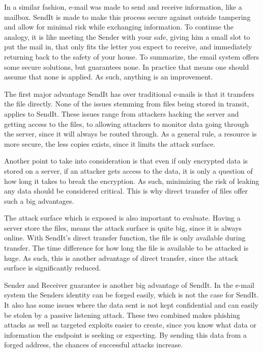 	In a similar fashion, e-mail was made to send and receive information, like a mailbox. SendIt is made to make this process secure against outside tampering and allow for minimal risk while exchanging information. To continue the analogy, it is like meeting the Sender with your safe, giving him a small slot to put the mail in, that only fits the letter you expect to receive, and immediately returning back to the safety of your house. To summarize, the email system offers some secure solutions, but guarantees none. In practice that means one should assume that none is applied. As such, anything is an improvement.

	The first major advantage SendIt has over traditional e-mails is that it transfers the file directly. None of the issues stemming from files being stored in transit, applies to SendIt. These issues range from attackers hacking the server and getting access to the files, to allowing attackers to monitor data going through the server, since it will always be routed through. As a general rule, a resource is more secure, the less copies exists, since it limits the attack surface.

	Another point to take into consideration is that even if only encrypted data is stored on a server, if an attacker gets access to the data, it is only a question of how long it takes to break the encryption. As such, minimizing the risk of leaking any data should be considered critical. This is why direct transfer of files offer such a big advantages.

	The attack surface which is exposed is also important to evaluate. Having a server store the files, means the attack surface is quite big, since it is always online. With SendIt's direct transfer function, the file is only available during transfer. The time difference for how long the file is available to be attacked is huge. As such, this is another advantage of direct transfer, since the attack surface is significantly reduced.

	Sender and Receiver guarantee is another big advantage of SendIt. In the e-mail system the Senders identity can be forged easily, which is not the case for SendIt. It also has some issues where the data sent is not kept confidential and can easily be stolen by a passive listening attack. These two combined makes phishing attacks as well as targeted exploits easier to create, since you know what data or information the endpoint is seeking or expecting. By sending this data from a forged address, the chances of successful attacks increase.

